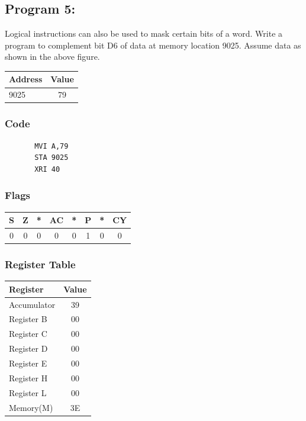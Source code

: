 \documentclass[]{report}
\begin{document}
\vspace{10mm}
\subsection*{Program 5: }
Logical instructions can also be used to mask certain bits of a word. Write a program to complement bit D6 of data at memory location 9025. Assume data as shown in the above figure. \\
\begin{tabular}{lc}
    \hline
    Address & Value  \\
    \hline
    9025 & 79 \\
    \hline
\end{tabular}
\subsubsection{Code}
\begin{verbatim}
	   MVI A,79
	   STA 9025
	   XRI 40
\end{verbatim}
\subsubsection{Flags}
\begin{tabular}{cccccccc}
\hline
    S & Z & *  & AC & *  & P & *  & CY  \\
    \hline
    0&0&0&0&0&1&0&0 \\
    \hline
\end{tabular}
\subsubsection {Register Table}
\begin{tabular}{lc}
    \hline
    Register & Value\\
    \hline
    Accumulator     & 39        \\
    Register B      &  00        \\
    Register C      &  00        \\
    Register D      &   00       \\
    Register E      &   00       \\
    Register H      &  00        \\
    Register L      &  00         \\
    Memory(M)       &      3E         \\
    \hline
\end{tabular}
\end{document}

